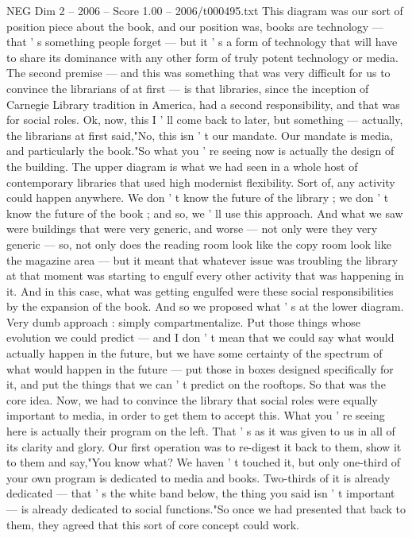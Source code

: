 \begin{textsample}{NEG Dim 2 – 2006 – Score 1.00 – 2006/t000495.txt}
This diagram was our sort of position piece about the book, and our position was, books are technology — that ' s something people forget — but it ' s a form of technology that will have to share its dominance with any other form of truly potent technology or media.
The second premise — and this was something that was very difficult for us to convince the librarians of at first — is that libraries, since the inception of Carnegie Library tradition in America, had a second responsibility, and that was for social roles.
Ok, now, this I ' ll come back to later, but something — actually, the librarians at first said,"No, this isn ' t our mandate.
Our mandate is media, and particularly the book."So what you ' re seeing now is actually the design of the building.
The upper diagram is what we had seen in a whole host of contemporary libraries that used high modernist flexibility.
Sort of, any activity could happen anywhere.
We don ' t know the future of the library ; we don ' t know the future of the book ; and so, we ' ll use this approach.
And what we saw were buildings that were very generic, and worse — not only were they very generic — so, not only does the reading room look like the copy room look like the magazine area — but it meant that whatever issue was troubling the library at that moment was starting to engulf every other activity that was happening in it.
And in this case, what was getting engulfed were these social responsibilities by the expansion of the book.
And so we proposed what ' s at the lower diagram.
Very dumb approach : simply compartmentalize.
Put those things whose evolution we could predict — and I don ' t mean that we could say what would actually happen in the future, but we have some certainty of the spectrum of what would happen in the future — put those in boxes designed specifically for it, and put the things that we can ' t predict on the rooftops.
So that was the core idea.
Now, we had to convince the library that social roles were equally important to media, in order to get them to accept this.
What you ' re seeing here is actually their program on the left.
That ' s as it was given to us in all of its clarity and glory.
Our first operation was to re-digest it back to them, show it to them and say,"You know what?
We haven ' t touched it, but only one-third of your own program is dedicated to media and books.
Two-thirds of it is already dedicated — that ' s the white band below, the thing you said isn ' t important — is already dedicated to social functions."So once we had presented that back to them, they agreed that this sort of core concept could work.

\end{textsample}
